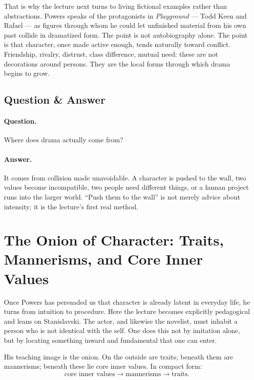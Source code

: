 That is why the lecture next turns to living fictional examples rather than abstractions. Powers speaks of the protagonists in \emph{Playground} --- Todd Keen and Rafael --- as figures through whom he could let unfinished material from his own past collide in dramatized form. The point is not autobiography alone. The point is that character, once made active enough, tends naturally toward conflict. Friendship, rivalry, distrust, class difference, mutual need: these are not decorations around persons. They are the local forms through which drama begins to grow.

\subsection{Question \& Answer}

\paragraph{Question.} Where does drama actually come from?

\paragraph{Answer.} It comes from collision made unavoidable. A character is pushed to the wall, two values become incompatible, two people need different things, or a human project runs into the larger world. ``Push them to the wall'' is not merely advice about intensity; it is the lecture's first real method.

\section{The Onion of Character: Traits, Mannerisms, and Core Inner Values}

Once Powers has persuaded us that character is already latent in everyday life, he turns from intuition to procedure. Here the lecture becomes explicitly pedagogical and leans on Stanislavski. The actor, and likewise the novelist, must inhabit a person who is not identical with the self. One does this not by imitation alone, but by locating something inward and fundamental that one can enter.

His teaching image is the onion. On the outside are traits; beneath them are mannerisms; beneath these lie core inner values. In compact form:
\begin{equation}
\text{core inner values} \to \text{mannerisms} \to \text{traits}.
\end{equation}

